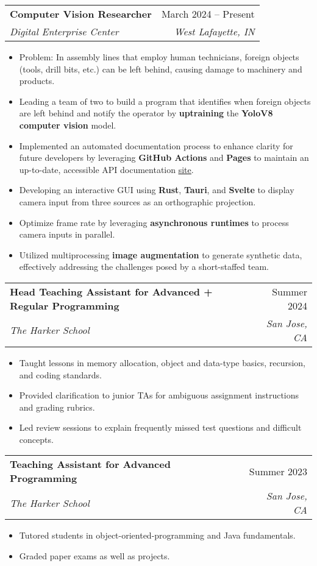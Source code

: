 \documentclass[letterpaper,11pt]{article}
\makeatletter
\newcommand{\resumeItem}[1]{
  \item\small{
    {#1 \vspace{-2pt}}
  }
}
\newcommand{\resumeSubheading}[4]{
  \vspace{-2pt}\item
    \begin{tabular*}{0.97\textwidth}[t]{l@{\extracolsep{\fill}}r}
      \textbf{#1} & #2 \\
      \textit{\small#3} & \textit{\small #4} \\
    \end{tabular*}\vspace{-7pt}
}
\newcommand{\resumeItemListStart}{\begin{itemize}}
\newcommand{\resumeItemListEnd}{\end{itemize}\vspace{-5pt}}
\makeatother
\begin{document}
    \resumeSubheading
      {Computer Vision Researcher}{March 2024 – Present}
      {Digital Enterprise Center}{West Lafayette, IN}
      \resumeItemListStart
        \resumeItem{Problem: In assembly lines that employ human technicians, foreign objects (tools, drill bits, etc.) can be left behind, causing damage to machinery and products.}
        \resumeItem{Leading a team of two to build a program that identifies when foreign objects are left behind and notify the operator by \textbf{uptraining} the \textbf{YoloV8 computer vision} model.
        }
        \resumeItem{Implemented an automated documentation process to enhance clarity for future developers by leveraging \textbf{GitHub Actions} and \textbf{Pages} to maintain an up-to-date, accessible API documentation \href{https://jlz22.github.io/Computer-Vision-for-FOD/index.html}{\underline{site}}.}
        \resumeItem{Developing an interactive GUI using \textbf{Rust}, \textbf{Tauri}, and \textbf{Svelte} to display camera input from three sources as an orthographic projection. 
        }
        \resumeItem{Optimize frame rate by leveraging \textbf{asynchronous runtimes} to process camera inputs in parallel.}
        \resumeItem{Utilized multiprocessing \textbf{image augmentation} to generate synthetic data, effectively addressing the challenges posed by a short-staffed team.
        }
        \resumeItemListEnd
      
    \resumeSubheading
      {Head Teaching Assistant for Advanced + Regular Programming}{Summer 2024}
      {The Harker School}{San Jose, CA}
      \resumeItemListStart
        \resumeItem{Taught lessons in memory allocation, object and data-type basics, recursion, and coding standards.
        }
        \resumeItem{Provided clarification to junior TAs for ambiguous assignment instructions and grading rubrics.
        }
        \resumeItem{Led review sessions to explain frequently missed test questions and difficult concepts.
        }
      \resumeItemListEnd

    \resumeSubheading
    {Teaching Assistant for Advanced Programming}{Summer 2023}
    {The Harker School}{San Jose, CA}
      \resumeItemListStart
        \resumeItem{Tutored students in object-oriented-programming and Java fundamentals.}
        \resumeItem{Graded paper exams as well as projects.}
        \resumeItemListEnd
      
\end{document}
